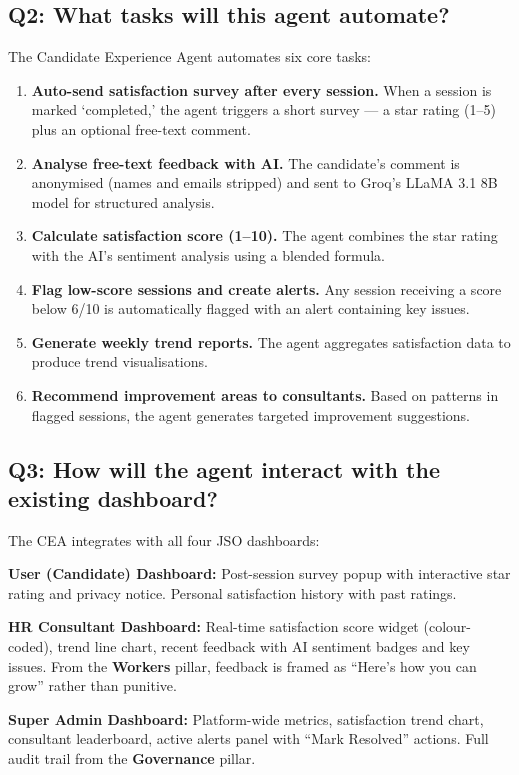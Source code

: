 \documentclass[11pt, a4paper]{article}
\begin{document}
\subsection{Q2: What tasks will this agent automate?}

The Candidate Experience Agent automates six core tasks:

\begin{enumerate}[leftmargin=2em]
\item \textbf{Auto-send satisfaction survey after every session.} When a session is marked `completed,' the agent triggers a short survey — a star rating (1--5) plus an optional free-text comment.
\item \textbf{Analyse free-text feedback with AI.} The candidate's comment is anonymised (names and emails stripped) and sent to Groq's LLaMA 3.1 8B model for structured analysis.
\item \textbf{Calculate satisfaction score (1--10).} The agent combines the star rating with the AI's sentiment analysis using a blended formula.
\item \textbf{Flag low-score sessions and create alerts.} Any session receiving a score below 6/10 is automatically flagged with an alert containing key issues.
\item \textbf{Generate weekly trend reports.} The agent aggregates satisfaction data to produce trend visualisations.
\item \textbf{Recommend improvement areas to consultants.} Based on patterns in flagged sessions, the agent generates targeted improvement suggestions.
\end{enumerate}

\subsection{Q3: How will the agent interact with the existing dashboard?}

The CEA integrates with all four JSO dashboards:

\textbf{User (Candidate) Dashboard:} Post-session survey popup with interactive star rating and privacy notice. Personal satisfaction history with past ratings.

\textbf{HR Consultant Dashboard:} Real-time satisfaction score widget (colour-coded), trend line chart, recent feedback with AI sentiment badges and key issues. From the \textbf{Workers} pillar, feedback is framed as ``Here's how you can grow'' rather than punitive.

\textbf{Super Admin Dashboard:} Platform-wide metrics, satisfaction trend chart, consultant leaderboard, active alerts panel with ``Mark Resolved'' actions. Full audit trail from the \textbf{Governance} pillar.
\end{document}
